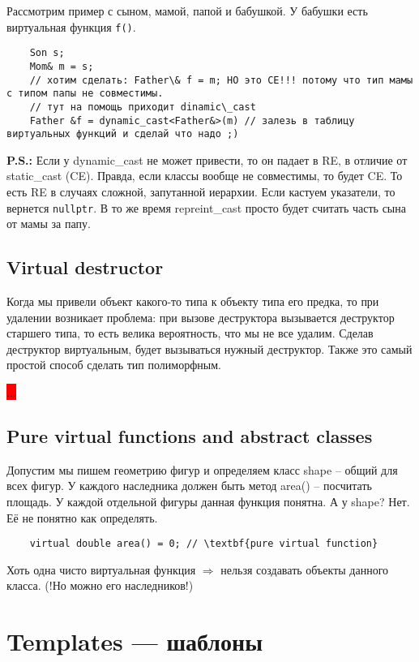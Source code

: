 \documentclass[12pt]{article}
\newcommand{\ps}{\textbf{P.S.: }}
\begin{document}
Рассмотрим пример с сыном, мамой, папой и бабушкой. У бабушки есть виртуальная функция \texttt{f()}.

\begin{lstlisting}
	Son s;
	Mom& m = s;
	// хотим сделать: Father\& f = m; НО это CE!!! потому что тип мамы с типом папы не совместимы. 
	// тут на помощь приходит dinamic\_cast
	Father &f = dynamic_cast<Father&>(m) // залезь в таблицу виртуальных функций и сделай что надо ;)
\end{lstlisting}

\ps Если у dynamic\_cast не может привести, то он падает в RE, в отличие от static\_cast (CE). Правда, если классы вообще не совместимы, то будет CE. То есть RE в случаях сложной, запутанной иерархии. Если кастуем указатели, то вернется \texttt{nullptr}. В то же время repreint\_cast просто будет считать часть сына от мамы за папу. 

\subsection{Virtual destructor}

Когда мы привели объект какого-то типа к объекту типа его предка, то при удалении возникает проблема: при вызове деструктора вызывается деструктор старшего типа, то есть велика вероятность, что мы не все удалим. Сделав деструктор виртуальным, будет вызываться нужный деструктор. Также это самый простой способ сделать тип полиморфным. 

\colorbox{red}{...}

\subsection{Pure virtual functions and abstract classes}

Допустим мы пишем геометрию фигур и определяем класс shape -- общий для всех фигур. У каждого наследника должен быть метод area() -- посчитать площадь. У каждой отдельной фигуры данная функция понятна. А у shape? Нет. Её не понятно как определять. 

\begin{lstlisting}
	virtual double area() = 0; // \textbf{pure virtual function}
\end{lstlisting}

Хоть одна чисто виртуальная функция $\Rightarrow$ нельзя создавать объекты данного класса. (!Но можно его наследников!) 

\section[Templates (шаблоны)]{Templates --- шаблоны}
\end{document}

